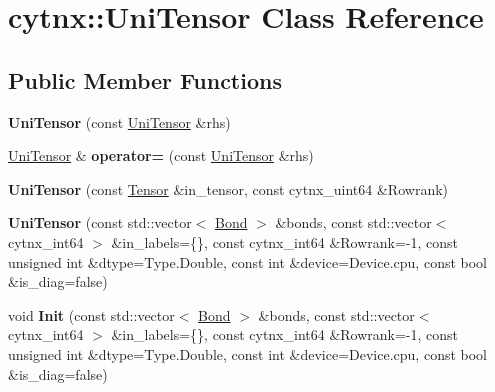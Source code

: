 \hypertarget{classcytnx_1_1UniTensor}{}\section{cytnx\+:\+:Uni\+Tensor Class Reference}
\label{classcytnx_1_1UniTensor}
\subsection*{Public Member Functions}
\begin{DoxyCompactItemize}
\item 
\mbox{\label{classcytnx_1_1UniTensor_a456aaaa3a3872c0bae08a51336703a51}} 
{\bfseries Uni\+Tensor} (const \hyperlink{classcytnx_1_1UniTensor}{Uni\+Tensor} \&rhs)
\item 
\mbox{\label{classcytnx_1_1UniTensor_acf9b9716f211126c98b3cb63140b72ef}} 
\hyperlink{classcytnx_1_1UniTensor}{Uni\+Tensor} \& {\bfseries operator=} (const \hyperlink{classcytnx_1_1UniTensor}{Uni\+Tensor} \&rhs)
\item 
\mbox{\label{classcytnx_1_1UniTensor_a7a5b9286ae4bc1ef5afa00105f222a13}} 
{\bfseries Uni\+Tensor} (const \hyperlink{classcytnx_1_1Tensor}{Tensor} \&in\+\_\+tensor, const cytnx\+\_\+uint64 \&Rowrank)
\item 
\mbox{\label{classcytnx_1_1UniTensor_acc305e7b7767843bd282a9c2cc49114c}} 
{\bfseries Uni\+Tensor} (const std\+::vector$<$ \hyperlink{classcytnx_1_1Bond}{Bond} $>$ \&bonds, const std\+::vector$<$ cytnx\+\_\+int64 $>$ \&in\+\_\+labels=\{\}, const cytnx\+\_\+int64 \&Rowrank=-\/1, const unsigned int \&dtype=Type.\+Double, const int \&device=Device.\+cpu, const bool \&is\+\_\+diag=false)
\item 
\mbox{\label{classcytnx_1_1UniTensor_ad6ba5c7452b4d83bfbaa9770060f8a63}} 
void {\bfseries Init} (const std\+::vector$<$ \hyperlink{classcytnx_1_1Bond}{Bond} $>$ \&bonds, const std\+::vector$<$ cytnx\+\_\+int64 $>$ \&in\+\_\+labels=\{\}, const cytnx\+\_\+int64 \&Rowrank=-\/1, const unsigned int \&dtype=Type.\+Double, const int \&device=Device.\+cpu, const bool \&is\+\_\+diag=false)
\item 
\mbox{\label{classcytnx_1_1UniTensor_affbe2fb50dea55d39b43dbabdf941a60}} 

\end{DoxyCompactItemize}
